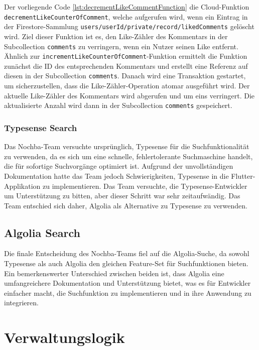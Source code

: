 Der vorliegende Code \ref{lst:decrementLikeCommentFunction} die Cloud-Funktion \texttt{decrementLikeCounterOfComment}, welche aufgerufen wird, wenn ein Eintrag in der Firestore-Sammlung \texttt{users/{userId}/private/record/likedComments} gelöscht wird. Ziel dieser Funktion ist es, den Like-Zähler des Kommentars in der Subcollection \texttt{comments} zu verringern, wenn ein Nutzer seinen Like entfernt. Ähnlich zur \texttt{incrementLikeCounterOfComment}-Funktion ermittelt die Funktion zunächst die ID des entsprechenden Kommentars und erstellt eine Referenz auf diesen in der Subcollection \texttt{comments}. Danach wird eine Transaktion gestartet, um sicherzustellen, dass die Like-Zähler-Operation atomar ausgeführt wird. Der aktuelle Like-Zähler des Kommentars wird abgerufen und um eins verringert. Die aktualisierte Anzahl wird dann in der Subcollection \texttt{comments} gespeichert.

\subsubsection{Typesense Search}

Das Nochba-Team versuchte ursprünglich, Typesense für die Suchfunktionalität zu verwenden, da es sich um eine schnelle, fehlertolerante Suchmaschine handelt, die für sofortige Suchvorgänge optimiert ist. Aufgrund der unvollständigen Dokumentation hatte das Team jedoch Schwierigkeiten, Typesense in die Flutter-Applikation zu implementieren. Das Team versuchte, die Typesense-Entwickler um Unterstützung zu bitten, aber dieser Schritt war sehr zeitaufwändig. Das Team entschied sich daher, Algolia als Alternative zu Typesense zu verwenden.

\subsection{Algolia Search}

Die finale Entscheidung des Nochba-Teams fiel auf die Algolia-Suche, da sowohl Typesense als auch Algolia den gleichen Feature-Set für Suchfunktionen bieten. Ein bemerkenswerter Unterschied zwischen beiden ist, dass Algolia eine umfangreichere Dokumentation und Unterstützung bietet, was es für Entwickler einfacher macht, die Suchfunktion zu implementieren und in ihre Anwendung zu integrieren.

\section{Verwaltungslogik}

